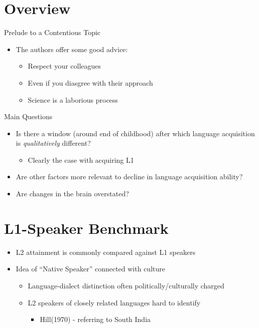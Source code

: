 \documentclass{beamer}
\begin{document}
\section{Overview}

\begin{frame}{Prelude to a Contentious Topic}
  \begin{itemize}
    \item The authors offer some good advice:
    \begin{itemize}
      \item Respect your colleagues
      \item Even if you diasgree with their approach
      \item Science is a laborious process
    \end{itemize}
  \end{itemize}
\end{frame}

\begin{frame}{Main Questions}
  \begin{itemize}
    \item Is there a window (around end of childhood) after which language acquisition is \emph{qualitatively} different?
    \begin{itemize}
      \item Clearly the case with acquiring L1
    \end{itemize}
    \item Are other factors more relevant to decline in language acquisition ability?
    \item Are changes in the brain overstated?
  \end{itemize}
\end{frame}

\section{L1-Speaker Benchmark}

\begin{frame}
  \begin{itemize}
    \item L2 attainment is commonly compared against L1 speakers
    \item Idea of ``Native Speaker'' connected with culture
    \begin{itemize}
      \item Language-dialect distinction often politically/culturally charged
      \item L2 speakers of closely related languages hard to identify
      \begin{itemize}
        \item Hill(1970) - referring to South India
      \end{itemize}
    \end{itemize}
  \end{itemize}
\end{frame}
\end{document}
